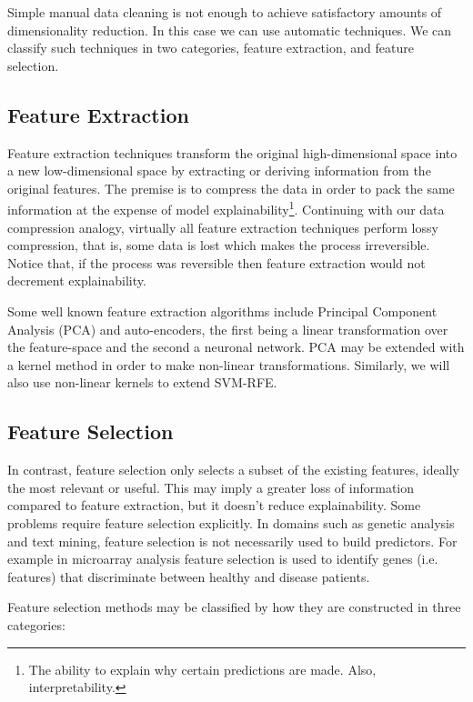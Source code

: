 Simple manual data cleaning is not enough to achieve satisfactory amounts of dimensionality reduction. In this case we can use automatic techniques. We can classify such techniques in two categories, feature extraction, and feature selection.

\subsection{Feature Extraction}

Feature extraction techniques transform the original high-dimensional space into a new low-dimensional space by extracting or deriving information from the original features. The premise is to compress the data in order to pack the same information at the expense of model explainability\footnote{The ability to explain why certain predictions are made. Also, interpretability.}. Continuing with our data compression analogy, virtually all feature extraction techniques perform lossy com\-pres\-sion, that is, some data is lost which makes the process irreversible. Notice that, if the process was reversible then feature extraction would not decrement explainability.

Some well known feature extraction algorithms include Principal Component Analysis (PCA) and auto-encoders, the first being a linear transformation over the feature-space and the second a neuronal network. PCA may be extended with a kernel method in order to make non-linear transformations. Similarly, we will also use non-linear kernels to extend SVM-RFE.

\subsection{Feature Selection}

In contrast, feature selection only selects a subset of the existing features, ideally the most relevant or useful. This may imply a greater loss of information compared to feature extraction, but it doesn't reduce explainability. Some problems require feature selection explicitly. In domains such as genetic analysis and text mining, feature selection is not necessarily used to build predictors. For example in micro\-array analysis feature selection is used to identify genes (i.e. features) that dis\-criminate between healthy and disease patients. 

Feature selection methods may be classified by how they are constructed in three categories:

